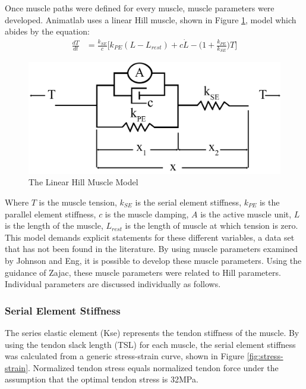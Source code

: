 \documentclass[runningheads,a4paper]{llncs}
\begin{document}
Once muscle paths were defined for every muscle, muscle parameters were developed. Animatlab uses a linear Hill muscle, shown in Figure \ref{fig:hill}, model which abides by the equation:
	\begin{align*}
			\frac{dT}{dt} &= \frac{k_{SE}}{c}\bigg[k_{PE}(L-L_{rest})+c \dot{L}-\big(1+\frac{k_{PE}}{k_{SE}}\big)T\bigg]
	\end{align*}
	\begin{figure}
		\centering
		\includegraphics[width=.8\textwidth]{Figures/hill1.png}
		\caption{The Linear Hill Muscle Model}
		\label{fig:hill}
	\end{figure} \par
Where $T$ is the muscle tension, $k_{SE}$ is the serial element stiffness, $k_{PE}$ is the parallel element stiffness, $c$ is the muscle damping, $A$ is the active muscle unit, $L$ is the length of the muscle, $L_{rest}$ is the length of muscle at which tension is zero. This model demands explicit statements for these different variables, a data set that has not been found in the literature. By using muscle parameters examined by Johnson\cite{johnson_application_2011} and Eng\cite{eng_scaling_2008}, it is possible to develop these muscle parameters. Using the guidance of Zajac\cite{zajac_muscle_1989}, these muscle parameters were related to Hill parameters. Individual parameters are discussed individually as follows. \par

	\subsubsection{Serial Element Stiffness}
		The series elastic element (Kse) represents the tendon stiffness of the muscle. By using the tendon slack length (TSL) for each muscle\cite{johnson_application_2011}, the serial element stiffness was calculated from a generic stress-strain curve\cite{zajac_muscle_1989}, shown in Figure \ref{fig:stress-strain}. Normalized tendon stress equals normalized tendon force under the assumption that the optimal tendon stress is 32MPa.
			
\end{document}
